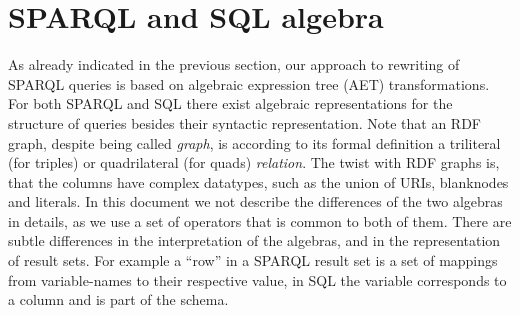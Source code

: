 \documentclass[a4paper,twoside,bibtotoc,abstracton,12pt,BCOR=15mm]{scrreprt}
\newcommand{\todo}[1]{\textbf{ToDo: \textit{#1}}}
\begin{document}
\section{SPARQL and SQL algebra}
As already indicated in the previous section, our approach to rewriting of SPARQL queries is based on algebraic expression tree (AET) transformations. 
For both SPARQL and SQL there exist algebraic representations for the structure of queries besides their syntactic representation.
Note that an RDF graph, despite being called \emph{graph}, is according to its formal definition a triliteral (for triples) or quadrilateral (for quads) \emph{relation}.
The twist with RDF graphs is, that the columns have complex datatypes, such as the union of URIs, blanknodes and literals.
In this document we not
describe the differences of the two algebras in details, as we use a set of operators that is common to both of them.
There are subtle differences in the interpretation of the algebras, and in the representation of result sets.
For example a ``row'' in a SPARQL result set is a set of mappings from variable-names to their respective value, in SQL the variable corresponds to a column
and is part of the schema.

\end{document}
